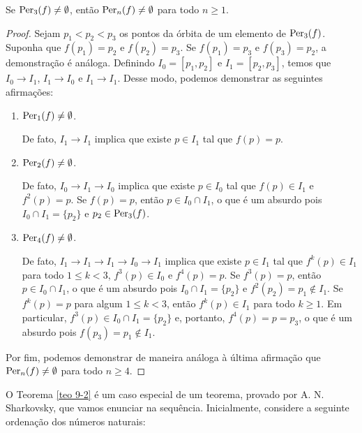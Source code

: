 \begin{theorem}\label{teo 9-2}
Se $\operatorname{Per}_3(f) \neq \emptyset$, então $\operatorname{Per}_n(f) \neq \emptyset$ para todo $n \geq 1$.
\end{theorem}

\begin{proof}
Sejam $p_1 < p_2 < p_3$ os pontos da órbita de um elemento de $\operatorname{Per}_3(f)$. Suponha que $f(p_1) = p_2$ e $f(p_2) = p_3$. Se $f(p_1) = p_3$ e $f(p_3) = p_2$, a demonstração é análoga.
Definindo $I_0 = [p_1, p_2]$ e $I_1 = [p_2, p_3]$, temos que $I_0 \longrightarrow I_1$, $I_1 \longrightarrow I_0$ e $I_1 \longrightarrow I_1$. Desse modo, podemos demonstrar as seguintes afirmações:

\begin{enumerate}[label=\alph*)]
\item $\operatorname{Per}_1(f) \neq \emptyset$.

De fato, $I_1 \longrightarrow I_1$ implica que existe $p \in I_1$ tal que $f(p) = p$.

\item $\operatorname{Per}_2(f) \neq \emptyset$.

De fato, $I_0 \longrightarrow I_1 \longrightarrow I_0$ implica que existe $p \in I_0$ tal que $f(p) \in I_1$ e $f^2(p) = p$.
Se $f(p) = p$, então $p \in I_0 \cap I_1$, o que é um absurdo pois $I_0 \cap I_1 = \lbrace p_2 \rbrace$ e $p_2 \in \operatorname{Per}_3(f)$.

\item $\operatorname{Per}_4(f) \neq \emptyset$.

De fato, $I_1 \longrightarrow I_1 \longrightarrow I_1 \longrightarrow I_0 \longrightarrow I_1$ implica que existe $p \in I_1$ tal que $f^k(p) \in I_1$ para todo $1 \leq k < 3$, $f^3(p) \in I_0$ e $f^4(p) = p$.
Se $f^3(p) = p$, então $p \in I_0 \cap I_1$, o que é um absurdo pois $I_0 \cap I_1 = \lbrace p_2 \rbrace$ e $f^2(p_2) = p_1 \notin I_1$.
Se $f^k(p) = p$ para algum $1 \leq k < 3$, então $f^k(p) \in I_1$ para todo $k \geq 1$.
Em particular, $f^3(p) \in I_0 \cap I_1 = \lbrace p_2 \rbrace$ e, portanto, $f^4(p) = p = p_3$, o que é um absurdo pois $f(p_3) = p_1 \notin I_1$.
\end{enumerate}

Por fim, podemos demonstrar de maneira análoga à última afirmação que $\operatorname{Per}_n(f) \neq \emptyset$ para todo $n \geq 4$.
\end{proof}

O Teorema \ref{teo 9-2} é um caso especial de um teorema, provado por A. N. Sharkovsky, que vamos enunciar na sequência.
Inicialmente, considere a seguinte ordenação dos números naturais:

